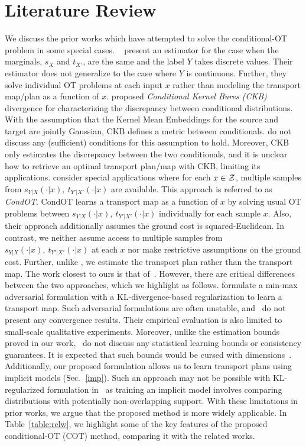 \section{Literature Review}
We discuss the prior works which have attempted to solve the conditional-OT problem in some special cases. ~\cite{Frogner15} present an estimator for the case when the marginals, $s_X$ and $t_{X'}$, are the same and the label $Y$ takes discrete values. Their estimator does not generalize to the case where $Y$ is continuous. Further, they solve individual OT problems at each input $x$ rather than modeling the transport map/plan as a function of $x$. \cite{Bures} proposed \textit{Conditional Kernel Bures (CKB)} divergence for characterizing the discrepancy between conditional distributions. With the assumption that the Kernel Mean Embeddings for the source and target are jointly Gaussian, CKB defines a metric between conditionals. \cite{Bures} do not discuss any (sufficient) conditions for this assumption to hold. Moreover, CKB only estimates the discrepancy between the two conditionals, and it is unclear how to retrieve an optimal transport plan/map with CKB, limiting its applications. \cite{Cuturi22} consider special applications where for each $x\in \calZ$, multiple samples from $s_{Y|X}(\cdot|x), ~t_{Y'|X'}(\cdot|x)$ are available. This approach is referred to as \textit{CondOT}. CondOT learns a transport map as a function of $x$ by solving usual OT problems between $s_{Y|X}(\cdot|x), ~t_{Y'|X'}(\cdot|x)$ individually for each sample $x$. Also, their approach additionally assumes the ground cost is squared-Euclidean. In contrast, we neither assume access to multiple samples from $s_{Y|X}(\cdot|x), ~t_{Y'|X'}(\cdot|x)$ at each $x$ nor make restrictive assumptions on the ground cost. Further, unlike \cite{Cuturi22}, we estimate the transport plan rather than the transport map. The work closest to ours is that of~\cite{Tabak21}. However, there are critical differences between the two approaches, which we highlight as follows. \cite{Tabak21} formulate a min-max adversarial formulation with a KL-divergence-based regularization to learn a transport map. Such adversarial formulations are often unstable, and~\cite{Tabak21} do not present any convergence results. Their empirical evaluation is also limited to small-scale qualitative experiments. Moreover, unlike the estimation bounds proved in our work,~\cite{Tabak21} do not discuss any statistical learning bounds or consistency guarantees. It is expected that such bounds would be cursed with dimensions~\citep{sduot, sliced-uot}. Additionally, our proposed formulation allows us to learn transport plans using implicit models ($\S$~\ref{imp}). Such an approach may not be possible with KL-regularized formulation in~\cite{Tabak21} as training an implicit model involves comparing distributions with potentially non-overlapping support. With these limitations in prior works, we argue that the proposed method is more widely applicable. In Table~\ref{table:relw}, we highlight some of the key features of the proposed conditional-OT (COT) method, comparing it with the related works.
